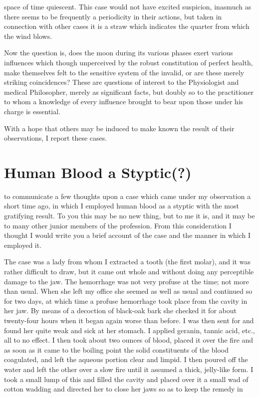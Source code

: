 space of time quiescent. This case would not have excited suspicion,
inasmuch as there seems to be frequently a periodicity in their
actions, but taken in connection with other cases it is a straw which
indicates the quarter from which the wind blows.

Now the question is, does the moon during its various phases exert
various influences which though unperceived by the robust constitution
of perfect health, make themselves felt to the sensitive system
of the invalid, or are these merely striking coincidences? These are
questions of interest to the Physiologist and medical Philosopher,
merely as significant facts, but doubly so to the practitioner to whom
a knowledge of every influence brought to bear upon those under his
charge is essential.

With a hope that others may be induced to make known the result
of their observations, I report these cases.

\section{Human Blood a Styptic(?)}


 to communicate a few thoughts upon a case which came under
my observation a short time ago, in which I employed human blood as
a styptic with the most gratifying result. To you this may be no new
thing, but to me it is, and it may be to many other junior members of
the profession. From this consideration I thought I would write you
a brief account of the case and the manner in which I employed it.

The case was a lady from whom I extracted a tooth (the first molar),
and it was rather difficult to draw, but it came out whole and without
doing any perceptible damage to the jaw. The hemorrhage was not
very profuse at the time; not more than usual. When she left my office
she seemed as well as usual and continued so for two days, at which
time a profuse hemorrhage took place from the cavity in her jaw. By
means of a decoction of black-oak bark she checked it for about twenty-four
hours when it began again worse than before. I was then sent for
and found her quite weak and sick at her stomach. I applied geranin,
tannic acid, etc., all to no effect. I then took about two ounces of blood,
placed it over the fire and as soon as it came to the boiling point the
solid constituents of the blood coagulated, and left the aqueous portion
clear and limpid. I then poured off the water and left the other over
a slow fire until it assumed a thick, jelly-like form. I took a small lump
of this and filled the cavity and placed over it a small wad of cotton
wadding and directed her to close her jaws so as to keep the remedy in\endinput
